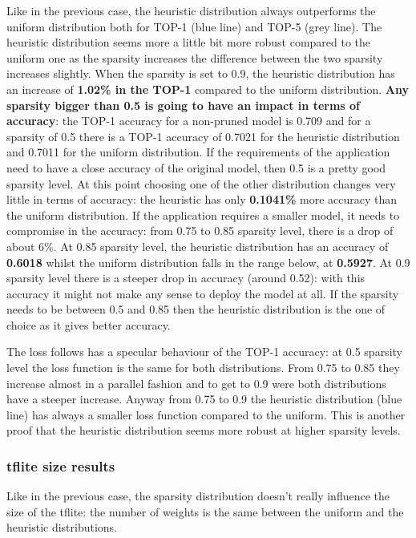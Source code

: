 Like in the previous case, the heuristic distribution always outperforms the
uniform distribution both for TOP-1 (blue line) and TOP-5 (grey line).
The heuristic distribution seems more a little bit more robust compared to the
uniform one as the sparsity increases the difference between the two sparsity
increases slightly.
When the sparsity is set to 0.9, the heuristic distribution has an increase of
\textbf{1.02\% in the TOP-1} compared to the uniform distribution.
\textbf{Any sparsity bigger than 0.5 is going to have an impact in terms of
accuracy}: the TOP-1 accuracy for a non-pruned model is 0.709 and for a
sparsity of 0.5 there is a TOP-1 accuracy of 0.7021 for the heuristic
distribution and 0.7011 for the uniform distribution.
If the requirements of the application need to have a close accuracy of the
original model, then 0.5 is a pretty good sparsity level. At this point
choosing one of the other distribution changes very little in terms of
accuracy: the heuristic has only \textbf{0.1041\%} more accuracy than the
uniform distribution.
If the application requires a smaller model, it needs to compromise in the
accuracy: from 0.75 to 0.85 sparsity level, there is a drop of about 6\%.
At 0.85 sparsity level, the heuristic distribution has an accuracy of
\textbf{0.6018} whilst the uniform distribution falls in the range below, at
\textbf{0.5927}.
At 0.9 sparsity level there is a steeper drop in accuracy (around 0.52): with
this accuracy it might not make any sense to deploy the model at all.
If the sparsity needs to be between 0.5 and 0.85 then the heuristic
distribution is the one of choice as it gives better accuracy.

The loss follows has a specular behaviour of the TOP-1 accuracy: at 0.5
sparsity level the loss function is the same for both distributions.
From 0.75 to 0.85 they increase almost in a parallel fashion and to get to 0.9
were both distributions have a steeper increase.
Anyway from 0.75 to 0.9 the heuristic distribution (blue line) has always a
smaller loss function compared to the uniform.
This is another proof that the heuristic distribution seems more robust at
higher sparsity levels.

\subsubsection{tflite size results}
Like in the previous case, the sparsity distribution doesn't really influence
the size of the tflite: the number of weights is the same between the uniform
and the heuristic distributions.

